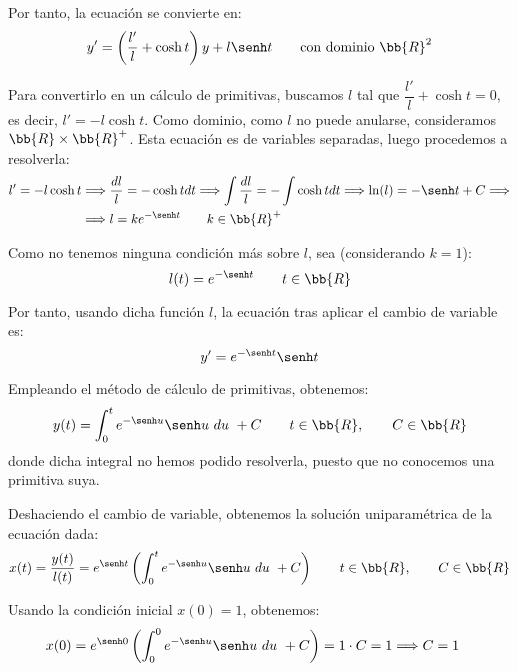 \begin{ejercicio}
\begin{enumerate}
        Por tanto, la ecuación se convierte en:
        \begin{equation*}
            y' = \left(\dfrac{l'}{l} +\cosh t\right)y + l\senh t\qquad \text{con dominio }\bb{R}^2
        \end{equation*}

        Para convertirlo en un cálculo de primitivas, buscamos $l$ tal que $\dfrac{l'}{l} +\cosh t = 0$, es decir, $l' = -l\cosh t$. Como dominio, como $l$ no puede anularse, consideramos $\bb{R}\times \bb{R}^+$.
        Esta ecuación es de variables separadas, luego procedemos a resolverla:
        \begin{align*}
            l'=-l\cosh t &\Longrightarrow \dfrac{dl}{l} = -\cosh t dt \Longrightarrow \int \dfrac{dl}{l} = -\int \cosh t dt \Longrightarrow \ln(l) = -\senh t + C \Longrightarrow\\&\Longrightarrow l =  ke^{-\senh t} \qquad k\in \bb{R}^+
        \end{align*}

        Como no tenemos ninguna condición más sobre $l$, sea (considerando $k=1$):
        \begin{equation*}
            l(t) = e^{-\senh t} \qquad t\in \bb{R}
        \end{equation*}

        Por tanto, usando dicha función $l$, la ecuación tras aplicar el cambio de variable es:
        \begin{equation*}
            y' = e^{-\senh t}\senh t
        \end{equation*}

        Empleando el método de cálculo de primitivas, obtenemos:
        \begin{equation*}
            y(t) = \int_0^t e^{-\senh u}\senh u~du~+ C \qquad t\in \bb{R}, \qquad C\in \bb{R}
        \end{equation*}
        donde dicha integral no hemos podido resolverla, puesto que no conocemos una primitiva suya.

        Deshaciendo el cambio de variable, obtenemos la solución uniparamétrica de la ecuación dada:
        \begin{equation*}
            x(t) = \dfrac{y(t)}{l(t)} = e^{\senh t}\left(\int_0^t e^{-\senh u}\senh u~du~+ C\right) \qquad t\in \bb{R}, \qquad C\in \bb{R}
        \end{equation*}

        Usando la condición inicial $x(0)=1$, obtenemos:
        \begin{align*}
            x(0) &= e^{\senh 0}\left(\int_0^0 e^{-\senh u}\senh u~du~+ C\right) = 1\cdot C = 1 \Longrightarrow C=1
        \end{align*}


\end{enumerate}
\end{ejercicio}
